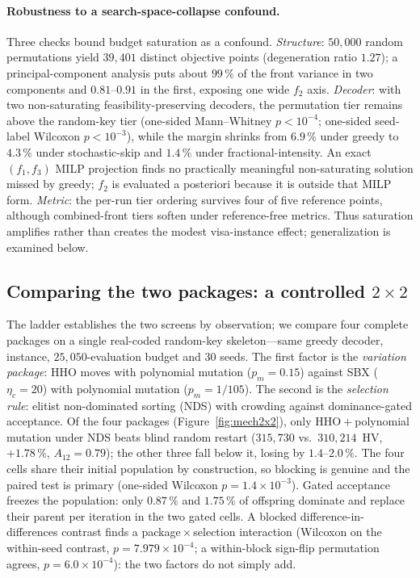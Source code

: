 \documentclass[runningheads]{llncs}
\newcommand{\HV}{\textsf{HV}}
\begin{document}
\paragraph{Robustness to a search-space-collapse confound.}
Three checks bound budget saturation as a confound. \emph{Structure}: $50{,}000$ random permutations yield $39{,}401$ distinct objective points (degeneration ratio $1.27$); a principal-component analysis puts about $99\,\%$ of the front variance in two components and $0.81$--$0.91$ in the first, exposing one wide $f_2$ axis. \emph{Decoder}: with two non-saturating feasibility-preserving decoders, the permutation tier remains above the random-key tier (one-sided Mann--Whitney $p<10^{-4}$; one-sided seed-label Wilcoxon $p<10^{-3}$), while the margin shrinks from $6.9\,\%$ under greedy to $4.3\,\%$ under stochastic-skip and $1.4\,\%$ under fractional-intensity. An exact $(f_1,f_3)$ MILP projection finds no practically meaningful non-saturating solution missed by greedy; $f_2$ is evaluated a posteriori because it is outside that MILP form. \emph{Metric}: the per-run tier ordering survives four of five reference points, although combined-front tiers soften under reference-free metrics. Thus saturation amplifies rather than creates the modest visa-instance effect; generalization is examined below.

\subsection{Comparing the two packages: a controlled $2\times2$}
\label{sec:twoconditions}
The ladder establishes the two screens by observation; we compare four complete packages on a single real-coded random-key skeleton---same greedy decoder, instance, $25{,}050$-evaluation budget and 30 seeds. The first factor is the \emph{variation package}: HHO moves with polynomial mutation ($p_m=0.15$) against SBX ($\eta_c=20$) with polynomial mutation ($p_m=1/105$). The second is the \emph{selection rule}: elitist non-dominated sorting (NDS) with crowding against dominance-gated acceptance. Of the four packages (Figure~\ref{fig:mech2x2}), only HHO${}+{}$polynomial mutation under NDS beats blind random restart ($315{,}730$ vs.\ $310{,}214$~\HV, $+1.78\,\%$, $A_{12}=0.79$); the other three fall below it, losing by $1.4$--$2.0\,\%$. The four cells share their initial population by construction, so blocking is genuine and the paired test is primary (one-sided Wilcoxon $p=1.4\times10^{-3}$). Gated acceptance freezes the population: only $0.87\,\%$ and $1.75\,\%$ of offspring dominate and replace their parent per iteration in the two gated cells. A blocked difference-in-differences contrast finds a package${}\times{}$selection interaction (Wilcoxon on the within-seed contrast, $p=7.979\times10^{-4}$; a within-block sign-flip permutation agrees, $p=6.0\times10^{-4}$): the two factors do not simply add.
\end{document}
